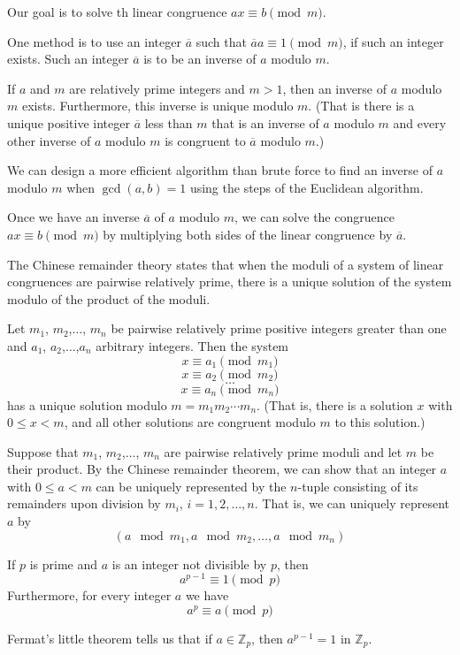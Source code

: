 \documentclass[../discrete.tex]{subfiles}
\begin{document}
Our goal is to solve th linear congruence $ax\equiv b\pmod{m}$.

One method is to use an integer $\overline{a}$ such that $\overline{a}a\equiv 1\pmod{m}$, if such an integer exists.
Such an integer $\overline{a}$ is to be an inverse of $a$ modulo $m$.

\begin{theorem}
    If $a$ and $m$ are relatively prime integers and $m>1$, then an inverse of $a$ modulo $m$ 
    exists. Furthermore, this inverse is unique modulo $m$. (That is there is a unique 
    positive integer $\overline{a}$ less than $m$ that is an inverse of $a$ modulo $m$ and every other 
    inverse of $a$ modulo $m$ is congruent to $\overline{a}$ modulo $m$.)
\end{theorem}

We can design a more efficient algorithm than brute force to find an inverse of $a$ 
modulo $m$ when $\gcd(a,b)=1$ using the steps of the Euclidean algorithm.

Once we have an inverse $\overline{a}$ of $a$ modulo $m$, we can solve the congruence 
$ax\equiv b\pmod{m}$ by multiplying both sides of the linear congruence by $\overline{a}$.

The Chinese remainder theory states that when the moduli of a system of linear congruences 
are pairwise relatively prime, there is a unique solution of the system modulo of the product of the moduli.
\begin{theorem}
    Let $m_1$, $m_2$,$\dots$, $m_n$ be pairwise relatively prime positive integers greater 
    than one and $a_1$, $a_2$,$\dots$,$a_n$ arbitrary integers. Then the system
    \[x\equiv a_1\pmod{m_1}\]
    \[x\equiv a_2\pmod{m_2}\]
    \[\dots\]
    \[x\equiv a_n\pmod{m_n}\]
    has a unique solution modulo $m=m_1m_2\cdots m_n$. (That is, there is a solution $x$ with $0\leq x<m$, and all other solutions are congruent modulo $m$ to this solution.)
\end{theorem}

Suppose that $m_1$, $m_2$,$\dots$, $m_n$ are pairwise relatively prime moduli and let $m$ be their 
product. By the Chinese remainder theorem, we can show that an integer $a$ with $0\leq a<m$ can be uniquely
represented by the $n$-tuple consisting of its remainders upon division by $m_i$, $i=1,2,\dots,n$. That is, we can uniquely represent $a$ by 
\[(a\mod m_1,a\mod m_2,\dots,a\mod m_n)\]

\begin{theorem}
    If $p$ is prime and $a$ is an integer not divisible by $p$, then 
    \[a^{p-1}\equiv 1\pmod{p}\]
    Furthermore, for every integer $a$ we have 
    \[a^p \equiv a\pmod{p}\]
\end{theorem}
Fermat's little theorem tells us that if $a\in \mathbb{Z}_p$, then $a^{p-1} = 1$ in $\mathbb{Z}_p$.
\end{document}
